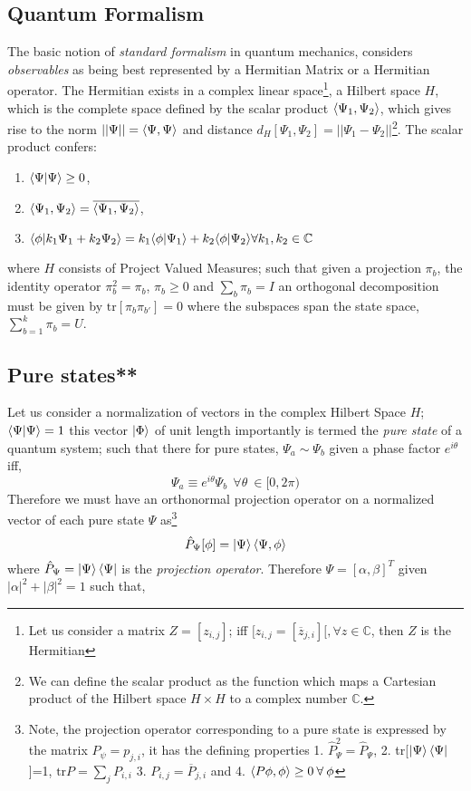 \documentclass[7pt]{article}
\begin{document}
\subsection{Quantum Formalism}
The basic notion of \emph{standard formalism} in quantum mechanics, considers \emph{observables} as being best represented by a Hermitian Matrix or a Hermitian operator. The Hermitian exists in a complex linear space\footnote{Let us consider a matrix $Z = [z_{i,j}]$; iff $[z_{i,j}
	=  [\overline{z}_{j,i}][,\forall z \in \mathbb{C}$, then $Z$ is the Hermitian}, a Hilbert space $H$, which is the complete space defined by the scalar product $\inn{\Psi_1,\Psi_2}$, which gives rise to the  norm $||\Psi|| = \inn{\Psi,\Psi}$ and distance $d_{H}[\Psi_1,\Psi_2] = ||\Psi_1 - \Psi_2 ||$\footnote{We can define the scalar product as the function which maps a Cartesian product of the Hilbert space $H \times H$ to a complex number $\mathbb{C}$.}. The scalar product confers:
\begin{enumerate}
	\item $\inn{\Psi | \Psi} \geq 0$, \\
	\item $\inn{\Psi_1,\Psi_2} = \overline{\inn{\Psi_1,\Psi_2}}$, \\
	\item $\inn{\phi|k_1 \Psi_1 + k_2 \Psi_2} = k_1\inn{\phi|\Psi_1} + k_2\inn{\phi|\Psi_2} {        }\forall k_1,k_2 \in \mathbb{C}$
\end{enumerate}
where $H$ consists of Project Valued Measures; such that given a projection $\pi_b$, the identity operator $\pi_b^2 = \pi_b$, $\pi_b \geq 0$ and $\sum_{b} \pi_b = I$  an orthogonal decomposition must be given by $\text{tr}[ \pi_b \pi_{b'} ] = 0$ where the subspaces span the state space, $\sum_{b=1}^{k} \pi_b = U$.
\subsection{Pure states**}
Let us consider a normalization of vectors in the complex Hilbert Space $H$;
$
\braket{\Psi} = 1
$
this vector $\ket{\Phi}$ of unit length importantly is termed the \emph{pure state} of a quantum system; such that there for pure states, $\Psi_a \sim \Psi_b$ given a phase factor $e^{i \theta}$ iff,
$$
\Psi_a \equiv e^{i\theta}\Psi_b \: \: \forall \theta \: \in [0,2 \pi)
$$
Therefore we must have an orthonormal projection operator on a normalized vector of each pure state $\Psi$ as\footnote{Note, the projection operator corresponding to a pure state is expressed by the matrix $P_{\psi} = {p}_{j,i}$, it has the defining properties 1. $\hat{P}_{\Psi}^2 = \hat{P}_{\Psi}$, 2. tr[$\ket{\Psi}\bra{\Psi}$]=1, \st{$ \text{tr} P = \sum_j {P}_{i,i}$}  3. ${P}_{i,j} = \overline{{P}}_{j,i}$ and 4. $\inn{P\phi,\phi} \geq 0 \: \forall \: \phi$}
$$
\hat{P}_{\Psi}[ \phi] = \ket{\Psi}\inn{\Psi,\phi}
$$
where $\hat{P}_{\Psi} = \ket{\Psi}\bra{\Psi}$ is the \emph{projection operator}. Therefore $\Psi = [\alpha , \beta ]^T$ given $|\alpha|^2 +  |\beta|^2 = 1$ such that,
\end{document}
